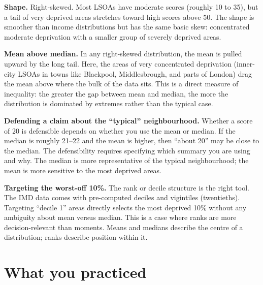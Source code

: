 \documentclass[
  letterpaper,
  11pt,
  twoside,
  openany]{scrbook}
\begin{document}
\begin{tcolorbox}[enhanced jigsaw, arc=.35mm, bottomrule=.15mm, bottomtitle=1mm, breakable, colback=white, colbacktitle=quarto-callout-note-color!10!white, colframe=quarto-callout-note-color-frame, coltitle=black, left=2mm, leftrule=.75mm, opacityback=0, opacitybacktitle=0.6, rightrule=.15mm, title=\textcolor{quarto-callout-note-color}{\faInfo}\hspace{0.5em}{Solution to Problem 10}, titlerule=0mm, toprule=.15mm, toptitle=1mm]

\textbf{Shape.} Right-skewed. Most LSOAs have moderate scores (roughly
10 to 35), but a tail of very deprived areas stretches toward high
scores above 50. The shape is smoother than income distributions but has
the same basic skew: concentrated moderate deprivation with a smaller
group of severely deprived areas.

\textbf{Mean above median.} In any right-skewed distribution, the mean
is pulled upward by the long tail. Here, the areas of very concentrated
deprivation (inner-city LSOAs in towns like Blackpool, Middlesbrough,
and parts of London) drag the mean above where the bulk of the data
sits. This is a direct measure of inequality: the greater the gap
between mean and median, the more the distribution is dominated by
extremes rather than the typical case.

\textbf{Defending a claim about the ``typical'' neighbourhood.} Whether
a score of 20 is defensible depends on whether you use the mean or
median. If the median is roughly 21--22 and the mean is higher, then
``about 20'' may be close to the median. The defensibility requires
specifying which summary you are using and why. The median is more
representative of the typical neighbourhood; the mean is more sensitive
to the most deprived areas.

\textbf{Targeting the worst-off 10\%.} The rank or decile structure is
the right tool. The IMD data comes with pre-computed deciles and
vigintiles (twentieths). Targeting ``decile 1'' areas directly selects
the most deprived 10\% without any ambiguity about mean versus median.
This is a case where ranks are more decision-relevant than moments.
Means and medians describe the centre of a distribution; ranks describe
position within it.

\end{tcolorbox}

\section{What you practiced}\label{what-you-practiced}
\end{document}
